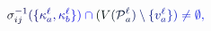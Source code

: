 \documentclass[12pt]{article}
\begin{document}
\makeatletter
\renewcommand*{\@textcolor}[3]{%
  \protect\leavevmode
  \begingroup
    \color#1{#2}#3%
  \endgroup
}
\makeatother
\begin{displaymath}
\mathcolor[RGB]{0,0,15}{\sigma} _ { \mathcolor[RGB]{0,0,30}{i} \mathcolor[RGB]{0,0,45}{j} } ^ { \mathcolor[RGB]{0,0,60}{-} \mathcolor[RGB]{0,0,75}{1} } \mathcolor[RGB]{0,0,90}{(} \mathcolor[RGB]{0,0,105}{\{} \mathcolor[RGB]{0,0,120}{\kappa} _ { \mathcolor[RGB]{0,0,135}{a} } ^ { \mathcolor[RGB]{0,0,150}{\ell} } \mathcolor[RGB]{0,0,165}{,} \mathcolor[RGB]{0,0,180}{\kappa} _ { \mathcolor[RGB]{0,0,195}{b} } ^ { \mathcolor[RGB]{0,0,210}{\ell} } \mathcolor[RGB]{0,0,225}{\}} \mathcolor[RGB]{0,0,240}{)} \mathcolor[RGB]{0,0,255}{\cap} \mathcolor[RGB]{0,15,0}{(} \mathcolor[RGB]{0,15,15}{V} \mathcolor[RGB]{0,15,30}{(} \mathcal { \mathcolor[RGB]{0,15,45}{P} } _ { \mathcolor[RGB]{0,15,60}{a} } ^ { \mathcolor[RGB]{0,15,75}{\ell} } \mathcolor[RGB]{0,15,90}{)} \mathcolor[RGB]{0,15,105}{\setminus} \mathcolor[RGB]{0,15,120}{\{} \mathcolor[RGB]{0,15,135}{v} _ { \mathcolor[RGB]{0,15,150}{a} } ^ { \mathcolor[RGB]{0,15,165}{\ell} } \mathcolor[RGB]{0,15,180}{\}} \mathcolor[RGB]{0,15,195}{)} \mathcolor[RGB]{0,15,210}{\neq} \mathcolor[RGB]{0,15,225}{\emptyset} \mathcolor[RGB]{0,15,240}{,}
\end{displaymath}
\end{document}
